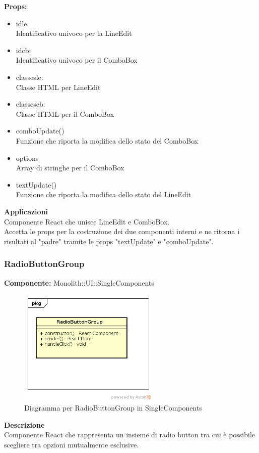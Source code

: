 \textbf{Props:} 
\begin{itemize}
\item idle: 
\\
Identificativo univoco per la LineEdit
\item idcb:
\\
Identificativo univoco per il ComboBox
\item classesle:
\\
Classe HTML per LineEdit
\item classescb: 
\\
Classe HTML per il ComboBox
\item comboUpdate()
\\
Funzione che riporta la modifica dello stato del ComboBox
\item options
\\
Array di stringhe per il ComboBox
\item textUpdate()
\\
Funzione che riporta la modifica dello stato del LineEdit
\end{itemize} 


\textbf{Applicazioni}\\
Componente React che unisce LineEdit e ComboBox.\\
Accetta le props per la costruzione dei due componenti interni e ne ritorna i risultati al "padre" tramite le props "textUpdate" e "comboUpdate". 


\clearpage

\subsubsection{RadioButtonGroup}
\textbf{Componente:}  Monolith::UI::SingleComponents\\
   \FloatBarrier
   \begin{figure}[ht]
   \centering
   \includegraphics[width=0.6\textwidth]{img/single-RadioButtonGroup.png}
   \caption{{Diagramma per RadioButtonGroup in SingleComponents}}
\end{figure}
\FloatBarrier
\textbf{Descrizione}\\
Componente React che rappresenta un insieme di radio button tra cui è possibile scegliere tra opzioni mutualmente esclusive.\\

